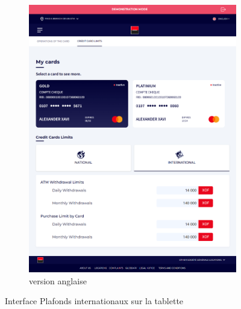\begin{figure}[!ht]
\begin{subfigure}[b]{0.49\textwidth}
        \includegraphics[width=\textwidth]{images/screens/limitsInter/tablette.png}
        \caption{version anglaise}
    \end{subfigure}
       \caption{Interface Plafonds internationaux sur la tablette}
\end{figure}
\newpage

